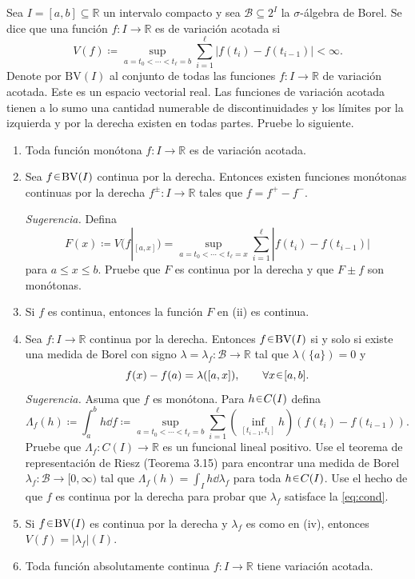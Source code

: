 \setcounter{neje}{19}
\begin{nejer}
Sea $I = [a, b] \subseteq \mathbb{R}$ un intervalo compacto y sea $\mathcal{B} \subseteq 2^I$ la $\sigma$-álgebra de Borel. Se dice que una función $f \colon I \to \mathbb{R}$ es de variación acotada si
$$
V(f) \coloneq \sup_{a=t_0 <\cdots < t_\ell = b} \sum_{i=1}^\ell |f(t_i) - f(t_{i-1})| < \infty.
$$
Denote por $\text{BV}(I)$ al conjunto de todas las funciones $f \colon I \to \mathbb{R}$ de variación acotada. Este es un espacio vectorial real. Las funciones de variación acotada tienen a lo sumo una cantidad numerable de discontinuidades y los límites por la izquierda y por la derecha existen en todas partes. Pruebe lo siguiente.
\begin{enumerate}[label = (\roman*), leftmargin=1.8em]
    \item Toda función monótona $f \colon I \to \mathbb{R}$ es de variación acotada.
    \item Sea $f \en \text{BV}(I)$ continua por la derecha. Entonces existen funciones monótonas continuas por la derecha $f^\pm \colon I \to \mathbb{R}$ tales que $f = f^+ - f^-$.
    
    \emph{Sugerencia.} Defina
    $$
    F(x) \coloneq V(f|_{[a,x]}) = \sup_{a=t_0 <\cdots < t_\ell = x} \sum_{i=1}^\ell |f(t_i) - f(t_{i-1})|
    $$
    para $a \le x \le b$. Pruebe que $F$ es continua por la derecha y que $F \pm f$ son monótonas.
    \item Si $f$ es continua, entonces la función $F$ en (ii) es continua.
    \item Sea $f \colon I \to \mathbb{R}$ continua por la derecha. Entonces $f \en \text{BV}(I)$ si y solo si existe una medida de Borel con signo $\lambda = \lambda_f \colon \mathcal{B} \to \mathbb{R}$ tal que $\lambda(\{a\}) = 0$ y
   \begin{equation}\label{eq:cond}
    f(x) - f(a) = \lambda([a, x]), \qquad \forall x\en[a,b].
    \end{equation}
    \emph{Sugerencia.} Asuma que $f$ es monótona. Para $h \en C(I)$ defina
    $$
    \Lambda_f(h) \coloneq \int_a^b h \dd{f} \coloneq \sup_{a=t_0 <\cdots < t_\ell = b} \sum_{i=1}^\ell \left( \inf_{[t_{i-1}, t_i]} h \right) (f(t_i) - f(t_{i-1})).
    $$
    Pruebe que $\Lambda_f \colon C(I) \to \mathbb{R}$ es un funcional lineal positivo. Use el teorema de representación de Riesz (Teorema 3.15) para encontrar una medida de Borel $\lambda_f \colon \mathcal{B} \to [0, \infty)$ tal que $\Lambda_f(h) = \int_I h \dd{\lambda_f}$ para toda $h \en C(I)$. Use el hecho de que $f$ es continua por la derecha para probar que $\lambda_f$ satisface la \cref{eq:cond}.
    \item Si $f \en \text{BV}(I)$ es continua por la derecha y $\lambda_f$ es como en (iv), entonces $V(f) = |\lambda_f|(I)$.
    \item Toda función absolutamente continua $f \colon I \to \mathbb{R}$ tiene variación acotada.
\end{enumerate}
\end{nejer}
